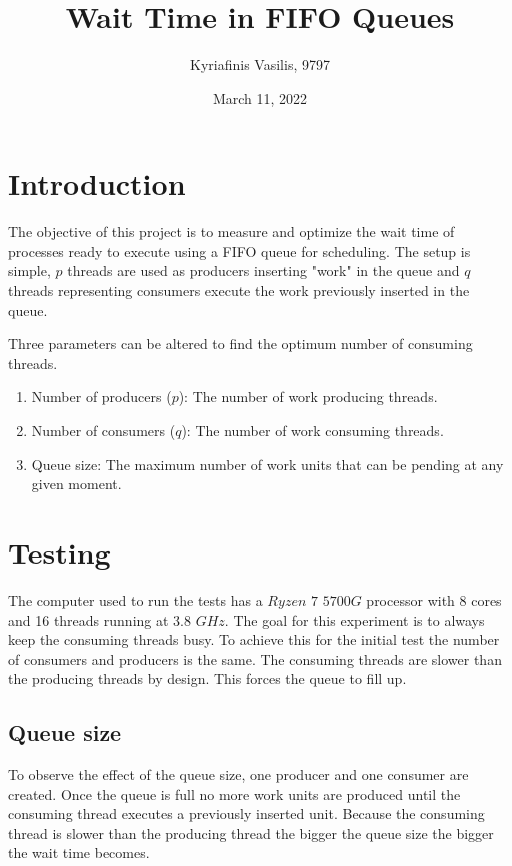 \documentclass[a4paper, 12pt]{report}
\title{\Large{\textbf{Wait Time in FIFO Queues}}}
\author{Kyriafinis Vasilis, 9797}
\date{March 11, 2022}
\begin{document}
    \maketitle
    
    \section*{Introduction}

    The objective of this project is to measure and optimize the wait time of processes ready to execute
    using a FIFO queue for scheduling. The setup is simple, \(p\) threads are used as producers inserting 
    "work" in the queue and \(q\) threads representing consumers execute the work previously inserted in the 
    queue.

    Three parameters can be altered to find the optimum number of consuming threads.

    \begin{enumerate}
        \item Number of producers (\(p\)): The number of work producing threads.
        \item Number of consumers (\(q\)): The number of work consuming threads.
        \item Queue size: The maximum number of work units that can be pending at any given moment.
    \end{enumerate}


    \section*{Testing}

    The computer used to run the tests has a \(Ryzen\) \(7\) \(5700G\) processor with 8 cores and 16 threads 
    running at \(3.8\) \(GHz\). The goal for this experiment is to always keep the consuming threads busy. To achieve
    this for the initial test the number of consumers and producers is the same. The consuming threads
    are slower than the producing threads by design. This forces the queue to fill up.

    \subsection*{Queue size}

    To observe the effect of the queue size, one producer and one consumer are created. Once the queue is
    full no more work units are produced until the consuming thread executes a previously inserted unit. Because the
    consuming thread is slower than the producing thread the bigger the queue size the bigger the wait time becomes.
    \\
\end{document}
